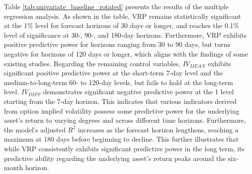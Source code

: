 \documentclass[a4paper, 12pt]{article}    %
\begin{document}
Table \ref{tab:univariate_baseline_rotated} presents the results of the multiple regression analysis. As shown in the table, VRP remains statistically significant at the 1\% level for forecast horizons of 30 days or longer, and reaches the 0.1\% level of significance at 30-, 90-, and 180-day horizons. Furthermore, VRP exhibits positive predictive power for horizons ranging from 30 to 90 days, but turns negative for horizons of 120 days or longer, which aligns with the findings of some existing studies. Regarding the remaining control variables, $IV_{MEAN}$ exhibits significant positive predictive power at the short-term 7-day level and the medium-to-long-term 60- to 120-day levels, but fails to hold at the long-term level. $IV_{DIFF}$ demonstrates significant negative predictive power at the 1\‰ level starting from the 7-day horizon. This indicates that various indicators derived from option implied volatility possess some predictive power for the underlying asset’s return to varying degrees and across different time horizons.
Furthermore, the model’s adjusted $R^2$ increases as the forecast horizon lengthens, reaching a maximum at 180 days before beginning to decline. This further illustrates that while VRP consistently exhibits significant predictive power in the long term, its predictive ability regarding the underlying asset’s return peaks around the six-month horizon.
\end{document}
